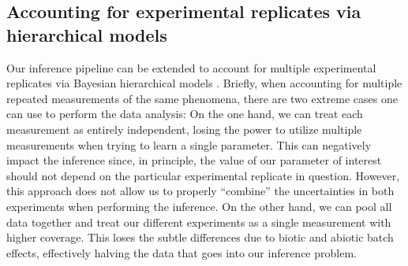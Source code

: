 \documentclass[
]{scrartcl}
\begin{document}
\begin{refsegment}
\begin{figure}
\end{figure}

\hypertarget{sec-replicates}{%
\subsection{Accounting for experimental replicates via hierarchical
models}\label{sec-replicates}}

Our inference pipeline can be extended to account for multiple
experimental replicates via Bayesian hierarchical models
\autocite{betancourt2013}. Briefly, when accounting for multiple
repeated measurements of the same phenomena, there are two extreme cases
one can use to perform the data analysis: On the one hand, we can treat
each measurement as entirely independent, losing the power to utilize
multiple measurements when trying to learn a single parameter. This can
negatively impact the inference since, in principle, the value of our
parameter of interest should not depend on the particular experimental
replicate in question. However, this approach does not allow us to
properly ``combine'' the uncertainties in both experiments when
performing the inference. On the other hand, we can pool all data
together and treat our different experiments as a single measurement
with higher coverage. This loses the subtle differences due to biotic
and abiotic batch effects, effectively halving the data that goes into
our inference problem.


\end{refsegment}
\end{document}
